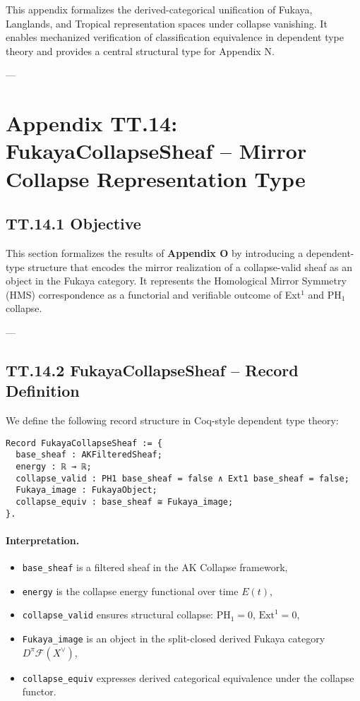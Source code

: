\documentclass[11pt]{article}
\begin{document}
{This appendix formalizes the derived-categorical unification of  
Fukaya, Langlands, and Tropical representation spaces under collapse vanishing.  
It enables mechanized verification of classification equivalence  
in dependent type theory and provides a central structural type for Appendix N.

---

\section*{Appendix TT.14: FukayaCollapseSheaf – Mirror Collapse Representation Type}

\subsection*{TT.14.1 Objective}

This section formalizes the results of \textbf{Appendix O} by introducing a dependent-type structure  
that encodes the mirror realization of a collapse-valid sheaf as an object in the Fukaya category.  
It represents the Homological Mirror Symmetry (HMS) correspondence as a functorial and verifiable outcome of Ext$^1$ and PH$_1$ collapse.

---

\subsection*{TT.14.2 FukayaCollapseSheaf – Record Definition}

We define the following record structure in Coq-style dependent type theory:

\begin{verbatim}
Record FukayaCollapseSheaf := {
  base_sheaf : AKFilteredSheaf;
  energy : ℝ → ℝ;
  collapse_valid : PH1 base_sheaf = false ∧ Ext1 base_sheaf = false;
  Fukaya_image : FukayaObject;
  collapse_equiv : base_sheaf ≅ Fukaya_image;
}.
\end{verbatim}

\paragraph{Interpretation.}
\begin{itemize}
  \item \texttt{base\_sheaf} is a filtered sheaf in the AK Collapse framework,
  \item \texttt{energy} is the collapse energy functional over time \( E(t) \),
  \item \texttt{collapse\_valid} ensures structural collapse: \( \mathrm{PH}_1 = 0 \), \( \mathrm{Ext}^1 = 0 \),
  \item \texttt{Fukaya\_image} is an object in the split-closed derived Fukaya category \( D^\pi\mathcal{F}(X^\vee) \),
  \item \texttt{collapse\_equiv} expresses derived categorical equivalence under the collapse functor.
\end{itemize}

}
\end{document}
